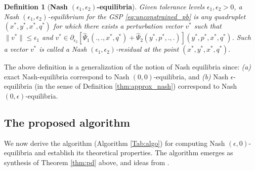 \documentclass[a4paper,9pt]{extarticle}
\newtheorem{definition}{Definition}
\begin{document}
\begin{definition}[\textbf{Nash $(\epsilon_1,\epsilon_2)$-equilibria}]
Given tolerance levels $\epsilon_1, \epsilon_2 > 0$, a Nash
$(\epsilon_1,\epsilon_2)$-equilibrium for the GSP \eqref{eq:unconstrained_pb}
is any quadruplet $(x^*, y^*, x^*, q^*)$ for which
there exists a perturbation vector $v^*$ such that
$\|v^*\| \le \epsilon_1$ and $v^* \in
\partial_{\epsilon_2}[\hat{\Psi}_1(., ., x^*, q^*) +
  \hat{\Psi}_2(y^*, p^*, ., .)](y^*,p^*,x^*,q^*)$.
Such a vector $v^*$ is called a Nash $(\epsilon_1,
\epsilon_2)$-residual at the point $(x^*,
y^*, x^*, q^*)$.
\label{thm:cool_notion}
\end{definition}


The above definition is a generalization of the notion of Nash
equilibria since: \textit{(a)} exact Nash-equilibria correspond to
Nash $(0,0)$-equilibria, and \textit{(b)} Nash $\epsilon$-equilibria (in the sense of Definition
  \ref{thm:approx_nash}) correspond to Nash $(0,\epsilon)$-equilibria.


\subsection{The proposed algorithm}
\label{sec:algo}
We now derive the algorithm (Algorithm \ref{Tab:algo}) for computing
Nash $(\epsilon, 0)$-equilibria and establish its theoretical
properties. The algorithm emerges as synthesis of Theorem \ref{thm:pd}
above, and ideas from \cite{he2013accelerating}.
\end{document}
